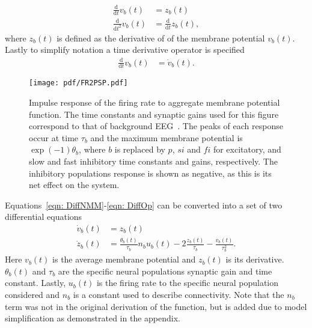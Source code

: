 \begin{align}
\label{eqn: dummy1}
\frac{\mathrm{d}}{\mathrm{d}t}v_{b}(t) &= z_{b}(t)\\
\label{eqn: dummy2}
\frac{\mathrm{d}}{\mathrm{d}t^2}v_{b}(t) &= \frac{\mathrm{d}}{\mathrm{d}t}z_{b}(t),\end{align} where $z_{b}(t)$ is defined as the derivative of of the membrane potential $v_{b}(t)$. Lastly to simplify notation a time derivative operator is specified \begin{align}%
\label{eqn: DiffOp}
\frac{\mathrm{d}}{\mathrm{d}t}v_{b}(t) &= \dot{v}_{b}(t).
\end{align} %
\begin{figure}%
	\centering
		\texttt{[image: pdf/FR2PSP.pdf]}
	\caption{Impulse response of the firing rate to aggregate membrane potential function. The time constants and synaptic gains used for this figure correspond to that of background EEG~\citep{wendling2002epileptic}. The peaks of each response occur at time $\tau_{b}$ and the maximum membrane potential is $\exp(-1)\theta_{b}$, where $b$ is replaced by $p$, $si$ and $fi$ for excitatory, and slow and fast inhibitory time constants and gains, respectively. The inhibitory populations response is shown as negative, as this is its net effect on the system.}
	\label{fig: FR2PSP_final}
\end{figure} %
Equations~\ref{eqn: DiffNMM}-\ref{eqn: DiffOp} can be converted into a set of two differential equations \begin{align}%
\label{eqn: FR2PSP1}
\dot{v}_{b}(t)&= z_{b}(t)\\
\label{eqn: FR2PSP2}
\dot{z}_{b}(t)&=\frac{\theta_{b}(t)}{\tau_{b}}n_{b}u_{b}(t)-2\frac{z_{b}(t)}{\tau_{b}}-\frac{v_{b}(t)}{\tau_{b}^{2}}.
\end{align} Here $v_{b}(t)$ is the average membrane potential and $z_{b}(t)$ is its derivative. $\theta_{b}(t)$ and $\tau_{b}$ are the specific neural populations synaptic gain and time constant. Lastly, $u_{b}(t)$ is the firing rate to the specific neural population considered and $n_{b}$ is a constant used to describe connectivity. Note that the $n_b$ term was not in the original derivation of the function, but is added due to model simplification as demonstrated in the appendix.

